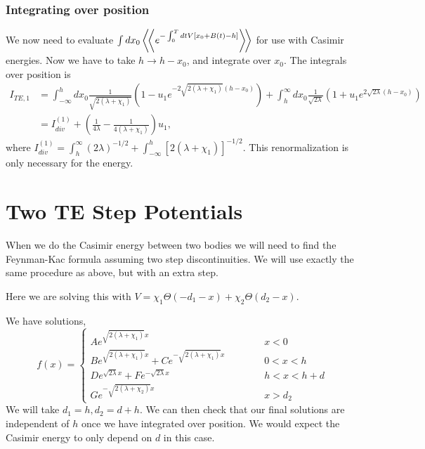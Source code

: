 \subsubsection{Integrating over position}

We now need to evaluate $\int dx_0 \left\langle\!\left\langle e^{-\int_0^T dt V[x_0 + B(t)-h]}\right\rangle\!\right\rangle$ for use with Casimir energies.   Now we have to take $h\rightarrow h-x_0$, and integrate over $x_0$.
The integrals over position is 
\begin{align}
I_{TE,1} &= \int_{-\infty}^h dx_0 \frac{1}{\sqrt{2(\lambda+\chi_1)}}\left(1 - u_1e^{-2\sqrt{2(\lambda+\chi_1)}(h-x_0)} \right) 
+ \int_h^\infty dx_0 \frac{1}{\sqrt{2\lambda}}\left(1 + u_1 e^{2\sqrt{2\lambda}(h-x_0)}\right) \\
&= I^{(1)}_{div}  +   \left(\frac{1}{4\lambda}- \frac{1}{4(\lambda+\chi_1)}\right)u_1,
\end{align}
where $I^{(1)}_{div} = \int_h^\infty(2\lambda)^{-1/2}+\int_{-\infty}^h[2(\lambda+\chi_1)]^{-1/2}$.  This renormalization is only necessary for the energy.  




\section{Two TE Step Potentials}

When we do the Casimir energy between two bodies we will need to find the Feynman-Kac formula assuming two step discontinuities.  We will use exactly the same procedure as above, but with an extra step. 

Here we are solving this with $V = \chi_1\Theta(-d_1-x) + \chi_2\Theta(d_2-x)$.

We have solutions, 
\begin{equation}
f(x) = \left\{ \begin{array}{lcr}
A e^{\sqrt{2(\lambda+\chi_1)}x}   & \hspace{1cm} & x<0\\
B e^{\sqrt{2(\lambda+\chi_1)}x} + C e^{-\sqrt{2(\lambda+\chi_1)}x}  & \hspace{1cm} & 0<x<h\\
D e^{\sqrt{2\lambda}x} + F e^{-\sqrt{2\lambda}x}  & \hspace{1cm} & h<x<h+d\\
G e^{-\sqrt{2(\lambda+\chi_2)}x} & \hspace{1cm} & x>d_2
\end{array}
\right.
\end{equation}
We will take $d_1 = h, d_2 = d+h$.  We can then check that our final solutions are independent of $h$ once we have integrated over position.   We would expect the Casimir energy to only depend on $d$ in this case.   

